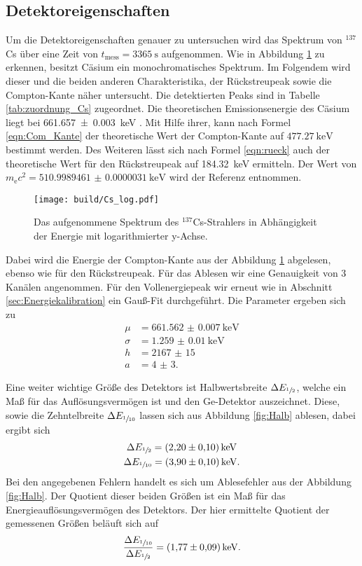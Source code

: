 \subsection{Detektoreigenschaften}
\label{sec:Detektoreigenschaften}
Um die Detektoreigenschaften genauer zu untersuchen wird das Spektrum von ${}^{137}$Cs über eine Zeit
von $t_\text{mess} = \SI{3365}{\second}$ aufgenommen. Wie in Abbildung \ref{fig:Cs_log} zu erkennen, besitzt Cäsium
ein monochromatisches Spektrum. Im Folgendem wird dieser und die beiden anderen Charakteristika, der Rückstreupeak
sowie die Compton-Kante näher untersucht. Die detektierten Peaks sind in Tabelle \ref{tab:zuordnung_Cs} zugeordnet. 
Die theoretischen Emissionsenergie des Cäsium liegt bei \SI{661.657(3)}{\kilo\electronvolt} \cite{referenz1}. Mit Hilfe
ihrer, kann nach Formel \ref{eqn:Com_Kante} der theoretische Wert der Compton-Kante auf $\SI{477.27}{\kilo\electronvolt}$
bestimmt werden. Des Weiteren lässt sich nach Formel \ref{eqn:rueck} auch der theoretische Wert für den Rückstreupeak
auf \SI{184.32}{\kilo\electronvolt} ermitteln. Der Wert von $m_\text{e} c^2 = \SI{510.9989461(31)}{\kilo\electronvolt}$ wird 
der Referenz \cite{codata} entnommen. 
\begin{figure}[htb]
 \centering
 \texttt{[image: build/Cs\_log.pdf]}
 \caption{Das aufgenommene Spektrum des ${}^{137}$Cs-Strahlers in Abhängigkeit der Energie mit logarithmierter y-Achse.}
 \label{fig:Cs_log}
\end{figure}

Dabei wird die Energie der Compton-Kante aus der Abbildung \ref{fig:Cs_log} abgelesen, ebenso wie für den 
Rückstreupeak. Für das Ablesen wir eine Genauigkeit von \num{3} Kanälen angenommen.
Für den Vollenergiepeak wir erneut wie in Abschnitt \ref{sec:Energiekalibration} ein Gauß-Fit durchgeführt.
Die Parameter ergeben sich zu
\begin{align*}
  \mu &= \SI{661.562(7)}{\kilo\electronvolt} \\
  \sigma &= \SI{1.259(10)}{\kilo\electronvolt} \\
  h &= \num{2167(15)} \\
  a &= \num{4(3)}.
\end{align*}

Eine weiter wichtige Größe des Detektors ist Halbwertsbreite $\Delta E_{\sfrac{1}{2}}$, welche ein Maß für das Auflösungsvermögen ist
und den Ge-Detektor auszeichnet. Diese, sowie die Zehntelbreite $\Delta E_{\sfrac{1}{10}}$ lassen sich aus Abbildung \ref{fig:Halb} ablesen, 
dabei ergibt sich 
\begin{gather*}
  \Delta E_{\sfrac{1}{2}} = \SI{2.20(10)}{\kilo\electronvolt} \\
  \Delta E_{\sfrac{1}{10}} = \SI{3.90(10)}{\kilo\electronvolt}.
\end{gather*}
Bei den angegebenen Fehlern handelt es sich um Ablesefehler aus der Abbildung \ref{fig:Halb}.
Der Quotient dieser beiden Größen ist ein Maß für das Energieauflösungsvermögen des Detektors. Der hier ermittelte 
Quotient der gemessenen Größen beläuft sich auf
\begin{equation*}
  \frac{\Delta E_{\sfrac{1}{10}}}{\Delta E_{\sfrac{1}{2}}} = \SI{1.77(9)}{\kilo\electronvolt}.
\end{equation*}

